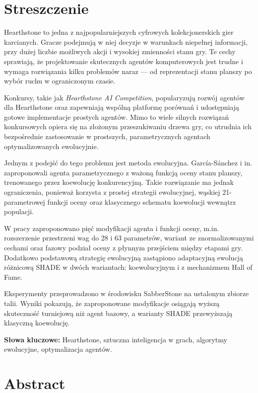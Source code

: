 \section*{Streszczenie}

Hearthstone to jedna z najpopularniejszych cyfrowych kolekcjonerskich gier karcianych. Gracze podejmują w niej decyzje w warunkach niepełnej informacji, przy dużej liczbie możliwych akcji i wysokiej zmienności stanu gry. Te cechy sprawiają, że projektowanie skutecznych agentów komputerowych jest trudne i wymaga rozwiązania kilku problemów naraz --- od reprezentacji stanu planszy po wybór ruchu w ograniczonym czasie.

Konkursy, takie jak \textit{Hearthstone AI Competition}, popularyzują rozwój agentów dla Hearthstone oraz zapewniają wspólną platformę porównań i udostępniają gotowe implementacje prostych agentów. Mimo to wiele silnych rozwiązań konkursowych opiera się na złożonym przeszukiwaniu drzewa gry, co utrudnia ich bezpośrednie zastosowanie w prostszych, parametrycznych agentach optymalizowanych ewolucyjnie.

Jednym z podejść do tego problemu jest metoda ewolucyjna. García-Sánchez i in. zaproponowali agenta parametrycznego z ważoną funkcją oceny stanu planszy, trenowanego przez koewolucję konkurencyjną. Takie rozwiązanie ma jednak ograniczenia, ponieważ korzysta z prostej strategii ewolucyjnej, wąskiej 21-parametrowej funkcji oceny oraz klasycznego schematu koewolucji wewnątrz populacji.

W pracy zaproponowano pięć modyfikacji agenta i funkcji oceny, m.in. rozszerzenie przestrzeni wag do 28 i 63 parametrów, wariant ze znormalizowanymi cechami oraz fazowy podział oceny z płynnym przejściem między etapami gry. Dodatkowo podstawową strategię ewolucyjną zastąpiono adaptacyjną ewolucją różnicową SHADE w dwóch wariantach: koewolucyjnym i z mechanizmem Hall of Fame.

Eksperymenty przeprowadzono w środowisku SabberStone na ustalonym zbiorze talii. Wyniki pokazują, że zaproponowane modyfikacje osiągają wyższą skuteczność turniejową niż agent bazowy, a warianty SHADE przewyższają klasyczną koewolucję.

\textbf{Słowa kluczowe:} Hearthstone, sztuczna inteligencja w grach, algorytmy ewolucyjne, optymalizacja agentów.

\section*{Abstract}


